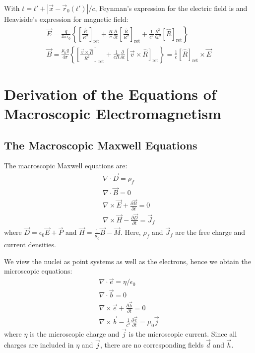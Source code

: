 \documentclass{article}
\begin{document}
	With \(t = t' + |\vec{x} - \vec{r}_0(t')|/c\), Feynman's expression for the electric field is and Heaviside's expression for magnetic field:
	\begin{gather}
		\vec{E} = \frac{q}{4\pi\epsilon_0} \left\{ \left[ \frac{\hat{R}}{R^2} \right]_{\text{ret}} + \frac{R}{c}\frac{\partial}{\partial t}\left[\frac{\hat{R}}{R^2}\right]_{\text{ret}} + \frac{1}{c^2}\frac{\partial^2}{\partial t^2}[\hat{R}]_{\text{ret}} \right\} \\
		\vec{B} = \frac{\mu_0 q}{4\pi} \left\{ \left[ \frac{\vec{v} \times \hat{R}}{R^2} \right]_{\text{ret}} + \frac{1}{cR} \frac{\partial}{\partial t} \left[ \vec{v} \times \hat{R} \right]_{\text{ret}} \right\} = \frac{1}{c}[\hat{R}]_{\text{ret}} \times \vec{E}
	\end{gather}
	
	\section{Derivation of the Equations of Macroscopic Electromagnetism}
	\subsection{The Macroscopic Maxwell Equations}
	The macroscopic Maxwell equations are:
	\begin{gather}
		\nabla \cdot \vec{D} = \rho_f \\
		\nabla \cdot \vec{B} = 0 \\
		\nabla \times \vec{E} + \frac{\partial\vec{B}}{\partial t} = 0 \\
		\nabla \times \vec{H} - \frac{\partial\vec{D}}{\partial t} = \vec{J}_f
	\end{gather}
	where \(\vec{D} = \epsilon_0\vec{E} + \vec{P}\) and \(\vec{H} = \frac{1}{\mu_0}\vec{B} - \vec{M}\). Here, \(\rho_f\) and \(\vec{J}_f\) are the free charge and current densities.
	
	We view the nuclei as point systems as well as the electrons, hence we obtain the microscopic equations:
	\begin{gather}
		\nabla \cdot \vec{e} = \eta / \epsilon_0 \\
		\nabla \cdot \vec{b} = 0 \\
		\nabla \times \vec{e} + \frac{\partial\vec{b}}{\partial t} = 0 \\
		\nabla \times \vec{b} - \frac{1}{c^2}\frac{\partial\vec{e}}{\partial t} = \mu_0 \vec{j}
	\end{gather}
	where \(\eta\) is the microscopic charge and \(\vec{j}\) is the microscopic current. Since all charges are included in \(\eta\) and \(\vec{j}\), there are no corresponding fields \(\vec{d}\) and \(\vec{h}\).
	
\end{document}

